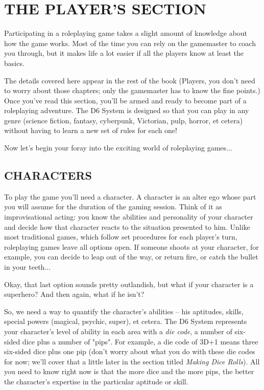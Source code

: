 \documentclass[10pt, a4paper, twoside]{book}
\begin{document}
	\chapter{THE PLAYER'S SECTION}
	\begin{multicols}{2}
		Participating in a roleplaying game takes a slight amount of knowledge about how the game works. Most of the time you can rely on the gamemaster to coach you through, but it makes life a lot easier if all the players know at least the basics. \par The details covered here appear in the rest of the book (Players, you don't need to worry about those chapters; only the gamemaster has to know the fine points.) Once you've read this section, you'll be armed and ready to become part of a roleplaying adventure. The D6 System is designed so that you can play in any genre (science fiction, fantasy, cyberpunk, Victorian, pulp, horror, et cetera) without having to learn a new set of rules for each one! \par Now let's begin your foray into the exciting world of roleplaying games...
		\section*{CHARACTERS}
		To play the game you'll need a character. A character is an alter ego whose part you will assume for the duration of the gaming session. Think of it as improvisational acting: you know the abilities and personality of your character and decide how that character reacts to the situation presented to him. Unlike most traditional games, which follow set procedures for each player's turn, roleplaying games leave all options open. If someone shoots at your character, for example, you can decide to leap out of the way, or return fire, or catch the bullet in your teeth... \par Okay, that last option sounds pretty outlandish, but what if your character is a superhero? And then again, what if he isn't? \par So, we need a way to quantify the character's abilities -- his aptitudes, skills, special powers (magical, psychic, super), et cetera. The D6 System represents your character's level of ability in each area with a \textit{die code}, a number of six-sided dice plus a number of "pips". For example, a die code of 3D+1 means three six-sided dice plus one pip (don't worry about what you do with these die codes for now; we'll cover that a little later in the section titled \textit{Making Dice Rolls}). All you need to know right now is that the more dice and the more pips, the better the character's expertise in the particular aptitude or skill. \par 
		\begin{mytextbox}

\end{mytextbox}
\end{multicols}
\end{document}
